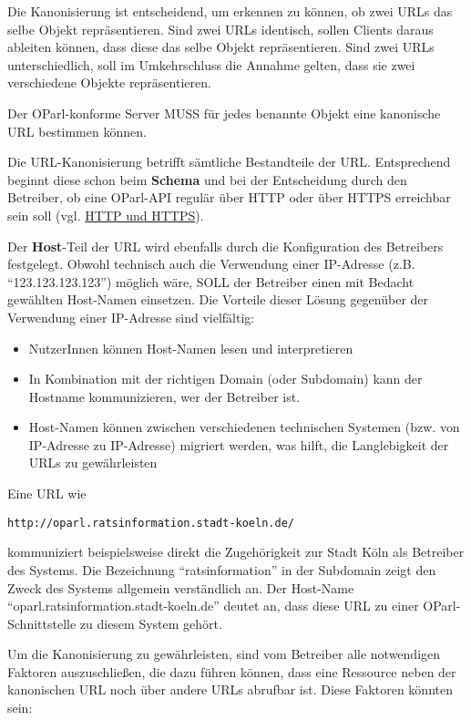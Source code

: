 \documentclass[,a4paper]{article}
\begin{document}
Die Kanonisierung ist entscheidend, um erkennen zu können, ob zwei URLs
das selbe Objekt repräsentieren. Sind zwei URLs identisch, sollen
Clients daraus ableiten können, dass diese das selbe Objekt
repräsentieren. Sind zwei URLs unterschiedlich, soll im Umkehrschluss
die Annahme gelten, dass sie zwei verschiedene Objekte repräsentieren.

Der OParl-konforme Server MUSS für jedes benannte Objekt eine kanonische
URL bestimmen können.

Die URL-Kanonisierung betrifft sämtliche Bestandteile der URL.
Entsprechend beginnt diese schon beim \textbf{Schema} und bei der
Entscheidung durch den Betreiber, ob eine OParl-API regulär über HTTP
oder über HTTPS erreichbar sein soll (vgl.
\hyperref[http-und-https]{HTTP und HTTPS}).

Der \textbf{Host}-Teil der URL wird ebenfalls durch die Konfiguration
des Betreibers festgelegt. Obwohl technisch auch die Verwendung einer
IP-Adresse (z.B. ``123.123.123.123'') möglich wäre, SOLL der Betreiber
einen mit Bedacht gewählten Host-Namen einsetzen. Die Vorteile dieser
Lösung gegenüber der Verwendung einer IP-Adresse sind vielfältig:

\begin{itemize}
\itemsep1pt\parskip0pt
\item
  NutzerInnen können Host-Namen lesen und interpretieren
\item
  In Kombination mit der richtigen Domain (oder Subdomain) kann der
  Hostname kommunizieren, wer der Betreiber ist.
\item
  Host-Namen können zwischen verschiedenen technischen Systemen (bzw.
  von IP-Adresse zu IP-Adresse) migriert werden, was hilft, die
  Langlebigkeit der URLs zu gewährleisten
\end{itemize}

Eine URL wie

\begin{verbatim}
http://oparl.ratsinformation.stadt-koeln.de/
\end{verbatim}

kommuniziert beispielsweise direkt die Zugehörigkeit zur Stadt Köln als
Betreiber des Systems. Die Bezeichnung ``ratsinformation'' in der
Subdomain zeigt den Zweck des Systems allgemein verständlich an. Der
Host-Name ``oparl.ratsinformation.stadt-koeln.de'' deutet an, dass diese
URL zu einer OParl-Schnittstelle zu diesem System gehört.

Um die Kanonisierung zu gewährleisten, sind vom Betreiber alle
notwendigen Faktoren auszuschließen, die dazu führen können, dass eine
Ressource neben der kanonischen URL noch über andere URLs abrufbar ist.
Diese Faktoren könnten sein:
\end{document}
